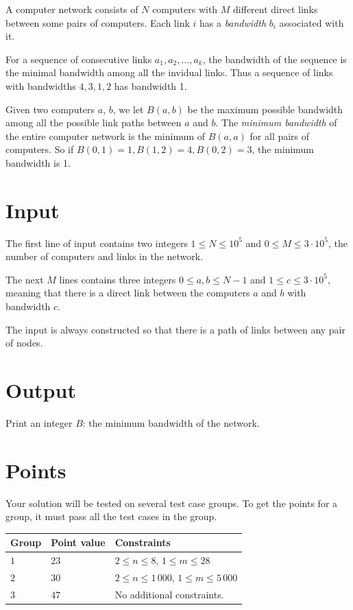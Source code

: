 A computer network consists of $N$ computers with $M$ different direct links between some pairs of computers. Each link $i$ has a \emph{bandwidth} $b_i$ associated with it.

For a sequence of consecutive links $a_1, a_2, ..., a_k$, the bandwidth of the sequence is the minimal bandwidth among all the invidual links. Thus a sequence of links with bandwidths $4, 3, 1, 2$ has bandwidth 1.

Given two computers $a$, $b$, we let $B(a, b)$ be the maximum possible bandwidth among all the possible link paths between $a$ and $b$. The \emph{minimum bandwidth} of the entire computer network is the minimum of $B(a, a)$ for all pairs of computers. So if $B(0, 1) = 1, B(1, 2) = 4, B(0, 2) = 3$, the minimum bandwidth is 1.


\section*{Input}
The first line of input contains two integers $1 \le N \le 10^5$ and $0 \le M \le 3 \cdot 10 ^5$, the number of computers and links in the network.

The next $M$ lines contains three integers $0 \le a, b \le N - 1$ and $1 \le c \le 3 \cdot 10^5$, meaning that there is a direct link between the computers $a$ and $b$ with bandwidth $c$.

The input is always constructed so that there is a path of links between any pair of nodes.


\section*{Output}
Print an integer $B$: the minimum bandwidth of the network.

\section*{Points}
Your solution will be tested on several test case groups.
To get the points for a group, it must pass all the test cases in the group.

\noindent
\begin{tabular}{| l | l | p{12cm} |}
  \hline
  \textbf{Group} & \textbf{Point value} & \textbf{Constraints} \\ \hline
  $1$    & $23$      & $2 \le n \le 8$, $1 \le m \le 28$ \\ \hline
  $2$    & $30$      & $2 \le n \le 1\,000$, $1 \le m \le 5\,000$ \\ \hline
  $3$    & $47$      & No additional constraints. \\ \hline
\end{tabular}
